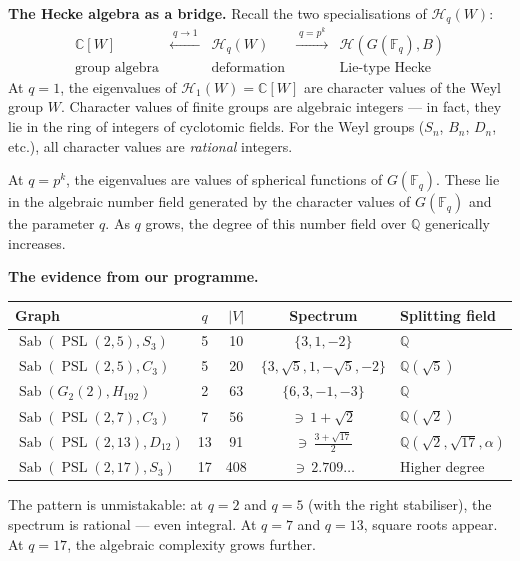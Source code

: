 \documentclass[11pt,a4paper]{article}
\theoremstyle{plain}
\theoremstyle{definition}
\newcommand{\C}{\mathbb{C}}
\newcommand{\Q}{\mathbb{Q}}
\newcommand{\F}{\mathbb{F}}
\newcommand{\Sab}{\operatorname{Sab}}
\newcommand{\PSL}{\operatorname{PSL}}
\begin{document}
\begin{tcolorbox}[breakable, colback=yellow!12, colframe=yellow!12,
  boxrule=0pt, sharp corners]
\textbf{The Hecke algebra as a bridge.}
Recall the two specialisations of $\mathcal{H}_q(W)$:
\[
  \begin{array}{ccccc}
  \C[W] & \xleftarrow{\;q \to 1\;} & \mathcal{H}_q(W)
  & \xrightarrow{\;q = p^k\;} & \mathcal{H}(G(\F_q), B) \\
  \text{group algebra} & & \text{deformation} & & \text{Lie-type Hecke}
  \end{array}
\]
At $q = 1$, the eigenvalues of $\mathcal{H}_1(W) = \C[W]$ are
character values of the Weyl group $W$. Character values of finite
groups are algebraic integers --- in fact, they lie in the ring of
integers of cyclotomic fields. For the Weyl groups ($S_n$, $B_n$,
$D_n$, etc.), all character values are \emph{rational} integers.

At $q = p^k$, the eigenvalues are values of spherical functions of
$G(\F_q)$. These lie in the algebraic number field generated by the
character values of $G(\F_q)$ and the parameter $q$. As $q$ grows, the
degree of this number field over $\Q$ generically increases.
\end{tcolorbox}

\begin{tcolorbox}[breakable, colback=black!5, colframe=black!5,
  boxrule=0pt, sharp corners]
\textbf{The evidence from our programme.}

\medskip
\begin{center}
\renewcommand{\arraystretch}{1.3}
\begin{tabular}{lcccl}
\toprule
Graph & $q$ & $|V|$ & Spectrum & Splitting field \\
\midrule
$\Sab(\PSL(2,5), S_3)$ & 5 & 10 & $\{3, 1, -2\}$
  & $\Q$ \\
$\Sab(\PSL(2,5), C_3)$ & 5 & 20
  & $\{3, \sqrt{5}, 1, -\sqrt{5}, -2\}$ & $\Q(\sqrt{5})$ \\
$\Sab(G_2(2), H_{192})$ & 2 & 63
  & $\{6, 3, -1, -3\}$ & $\Q$ \\
$\Sab(\PSL(2,7), C_3)$ & 7 & 56
  & $\ni\, 1+\sqrt{2}$ & $\Q(\sqrt{2})$ \\
$\Sab(\PSL(2,13), D_{12})$ & 13 & 91
  & $\ni\, \frac{3+\sqrt{17}}{2}$
  & $\Q(\sqrt{2},\sqrt{17},\alpha)$ \\
$\Sab(\PSL(2,17), S_3)$ & 17 & 408
  & $\ni\, 2.709\ldots$ & Higher degree \\
\bottomrule
\end{tabular}
\end{center}

\medskip
The pattern is unmistakable: at $q = 2$ and $q = 5$ (with the right
stabiliser), the spectrum is rational --- even integral. At $q = 7$
and $q = 13$, square roots appear. At $q = 17$, the algebraic
complexity grows further.
\end{tcolorbox}
\end{document}
